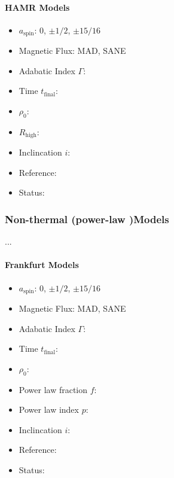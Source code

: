 \documentclass[twocolumn,twocolappendix,tighten,dvipsnames,linenumbers]{aastex63}
\begin{document}
\paragraph{HAMR Models}

\begin{itemize}
\item $a_\mathrm{spin}$: 0, $\pm1/2$, $\pm15/16$
\item Magnetic Flux: MAD, SANE
\item Adabatic Index $\Gamma$:
\item Time $t_\mathrm{final}$:
\item $\rho_0$:
\item $R_\mathrm{high}$:
\item Inclincation $i$:
\item Reference:
\item Status:
\end{itemize}

\subsubsection{Non-thermal (power-law )Models}

...

\paragraph{Frankfurt Models}

\begin{itemize}
\item $a_\mathrm{spin}$: 0, $\pm1/2$, $\pm15/16$
\item Magnetic Flux: MAD, SANE
\item Adabatic Index $\Gamma$:
\item Time $t_\mathrm{final}$:
\item $\rho_0$:
\item Power law fraction $f$:
\item Power law index $p$:
\item Inclincation $i$:
\item Reference:
\item Status:
\end{itemize}
\end{document}
